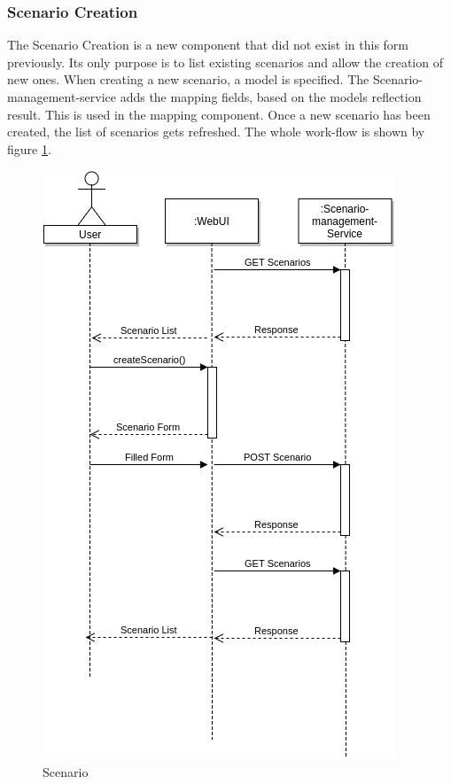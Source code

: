 \subsubsection{Scenario Creation}
The Scenario Creation is a new component that did not exist in this form previously. Its only purpose is to list existing scenarios and allow the creation of new ones. When creating a new scenario, a model is specified. The Scenario-management-service adds the mapping fields, based on the models reflection result. This is used in the mapping component. Once a new scenario has been created, the list of scenarios gets refreshed. The whole work-flow is shown by figure \ref{fig:scenario}.
\begin{figure}[H]
	\centering\includegraphics[width=.60\textwidth]{res/Scenario}
	\caption{Scenario}
	\label{fig:scenario}
\end{figure}

